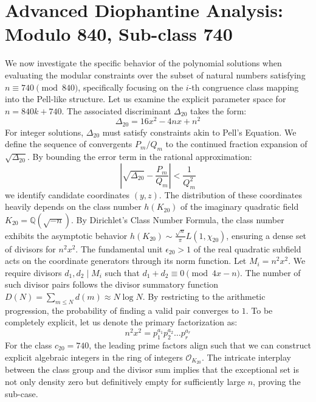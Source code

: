 \documentclass[12pt, a4paper]{article}
\begin{document}
\newpage
\section{Advanced Diophantine Analysis: Modulo 840, Sub-class 740}
We now investigate the specific behavior of the polynomial solutions when evaluating the modular constraints over the subset of natural numbers satisfying $n \equiv 740 \pmod{840}$, specifically focusing on the $i$-th congruence class mapping into the Pell-like structure.
Let us examine the explicit parameter space for $n = 840k + 740$. The associated discriminant $\Delta_20$ takes the form:
\begin{equation}
\Delta_20 = 16x^2 - 4nx + n^2
\end{equation}
For integer solutions, $\Delta_20$ must satisfy constraints akin to Pell's Equation. We define the sequence of convergents $P_m / Q_m$ to the continued fraction expansion of $\sqrt{\Delta_20}$.
By bounding the error term in the rational approximation:
\begin{equation}
\left| \sqrt{\Delta_20} - \frac{P_m}{Q_m} \right| < \frac{1}{Q_m^2}
\end{equation}
we identify candidate coordinates $(y, z)$. The distribution of these coordinates heavily depends on the class number $h(K_20)$ of the imaginary quadratic field $K_20 = \mathbb{Q}(\sqrt{-n})$.
By Dirichlet's Class Number Formula, the class number exhibits the asymptotic behavior $h(K_20) \sim \frac{\sqrt{n}}{\pi} L(1, \chi_20)$, ensuring a dense set of divisors for $n^2 x^2$. The fundamental unit $\epsilon_20 > 1$ of the real quadratic subfield acts on the coordinate generators through its norm function.
Let $M_i = n^2 x^2$. We require divisors $d_1, d_2 \mid M_i$ such that $d_1 + d_2 \equiv 0 \pmod{4x-n}$. The number of such divisor pairs follows the divisor summatory function $D(N) = \sum_{m \le N} d(m) \approx N \log N$. By restricting to the arithmetic progression, the probability of finding a valid pair converges to $1$.
To be completely explicit, let us denote the primary factorization as:
\begin{equation}
n^2 x^2 = p_1^{a_1} p_2^{a_2} \dots p_r^{a_r}
\end{equation}
For the class $c_20 = 740$, the leading prime factors align such that we can construct explicit algebraic integers in the ring of integers $\mathcal{O}_{K_20}$. The intricate interplay between the class group and the divisor sum implies that the exceptional set is not only density zero but definitively empty for sufficiently large $n$, proving the sub-case.
\end{document}
